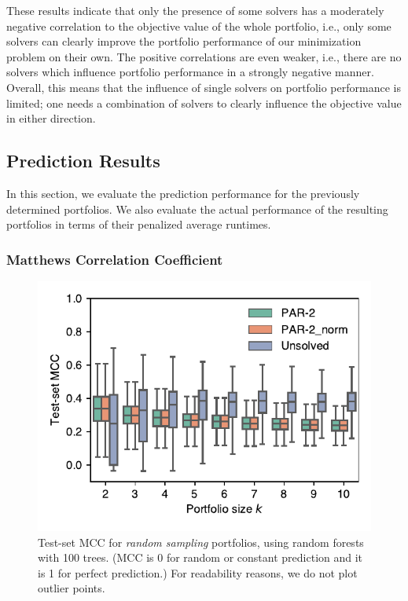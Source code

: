 \documentclass[conference]{IEEEtran}
\begin{document}
These results indicate that only the presence of some solvers has a moderately negative correlation to the objective value of the whole portfolio, i.e., only some solvers can clearly improve the portfolio performance of our minimization problem on their own.
The positive correlations are even weaker, i.e., there are no solvers which influence portfolio performance in a strongly negative manner.
Overall, this means that the influence of single solvers on portfolio performance is limited; one needs a combination of solvers to clearly influence the objective value in either direction.

\subsection{Prediction Results}

In this section, we evaluate the prediction performance for the previously determined portfolios. 
We also evaluate the actual performance of the resulting portfolios in terms of their penalized average runtimes. 

\subsubsection{Matthews Correlation Coefficient}

\begin{figure}[t]
	\centering
	\includegraphics[width=\columnwidth]{plots/prediction-test-mcc.pdf}
	\caption{
		Test-set MCC for \emph{random sampling} portfolios, using random forests with 100 trees.
		(MCC is 0 for random or constant prediction and it is 1 for perfect prediction.)
		For readability reasons, we do not plot outlier points.
	}
	\label{fig:prediction-test-mcc}
\end{figure}
\end{document}
